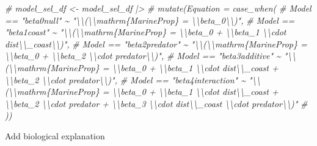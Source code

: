 \documentclass[
]{article}
\newenvironment{Shaded}{\begin{snugshade}}{\end{snugshade}}
\newcommand{\CommentTok}[1]{\textcolor[rgb]{0.56,0.35,0.01}{\textit{#1}}}
\begin{document}
\begin{Shaded}
\begin{Highlighting}[]
\CommentTok{\# model\_sel\_df \textless{}{-} model\_sel\_df |\textgreater{} }
\CommentTok{\#   mutate(Equation = case\_when(}
\CommentTok{\#     Model == "beta0null" \textasciitilde{} "\textbackslash{}\textbackslash{}(\textbackslash{}\textbackslash{}mathrm\{MarineProp\} = \textbackslash{}\textbackslash{}beta\_0\textbackslash{}\textbackslash{})",}
\CommentTok{\#     Model == "beta1coast" \textasciitilde{} "\textbackslash{}\textbackslash{}(\textbackslash{}\textbackslash{}mathrm\{MarineProp\} = \textbackslash{}\textbackslash{}beta\_0 + \textbackslash{}\textbackslash{}beta\_1 \textbackslash{}\textbackslash{}cdot dist\textbackslash{}\textbackslash{}\_coast\textbackslash{}\textbackslash{})",}
\CommentTok{\#     Model == "beta2predator" \textasciitilde{} "\textbackslash{}\textbackslash{}(\textbackslash{}\textbackslash{}mathrm\{MarineProp\} = \textbackslash{}\textbackslash{}beta\_0 + \textbackslash{}\textbackslash{}beta\_2 \textbackslash{}\textbackslash{}cdot predator\textbackslash{}\textbackslash{})",}
\CommentTok{\#     Model == "beta3additive" \textasciitilde{} "\textbackslash{}\textbackslash{}(\textbackslash{}\textbackslash{}mathrm\{MarineProp\} = \textbackslash{}\textbackslash{}beta\_0 + \textbackslash{}\textbackslash{}beta\_1 \textbackslash{}\textbackslash{}cdot dist\textbackslash{}\textbackslash{}\_coast + \textbackslash{}\textbackslash{}beta\_2 \textbackslash{}\textbackslash{}cdot predator\textbackslash{}\textbackslash{})",}
\CommentTok{\#     Model == "beta4interaction" \textasciitilde{} "\textbackslash{}\textbackslash{}(\textbackslash{}\textbackslash{}mathrm\{MarineProp\} = \textbackslash{}\textbackslash{}beta\_0 + \textbackslash{}\textbackslash{}beta\_1 \textbackslash{}\textbackslash{}cdot dist\textbackslash{}\textbackslash{}\_coast + \textbackslash{}\textbackslash{}beta\_2 \textbackslash{}\textbackslash{}cdot predator + \textbackslash{}\textbackslash{}beta\_3 \textbackslash{}\textbackslash{}cdot dist\textbackslash{}\textbackslash{}\_coast \textbackslash{}\textbackslash{}cdot predator\textbackslash{}\textbackslash{})"}
\CommentTok{\#   ))}
\end{Highlighting}
\end{Shaded}

Add biological explanation
\end{document}
